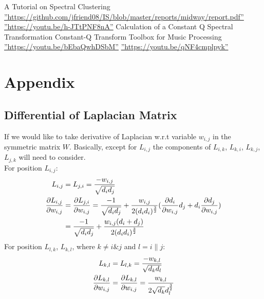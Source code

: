 \documentclass[final]{siamltexmm}
\begin{document}
\begin{thebibliography}{10}
 {\sc A Tutorial on Spectral Clustering}
 \hyperref[baseline]{''https://github.com/jfriend08/IS/blob/master/reports/midway/report.pdf''}
 \hyperref[baseline]{''https://youtu.be/h-JTtPNF8nA''}
 {\sc Calculation of a Constant Q Spectral Transformation}
 {\sc Constant-Q Transform Toolbox for Music Processing}
 \hyperref[baseline]{''https://youtu.be/bEbaQwhDSbM''}
 \hyperref[baseline]{''https://youtu.be/qNF4cmplpyk''}


\end{thebibliography}

\section{Appendix}
\subsection{Differential of Laplacian Matrix}
If we would like to take derivative of Laplacian w.r.t variable $w_{i,j}$ in the symmetric matrix $W$. Basically, except for $L_{i,j}$ the components of $L_{i,k}$, $L_{k,i}$, $L_{k,j}$, $L_{j,k}$ will need to consider.\\
For position $L_{i,j}$:
\begin{equation}
\begin{aligned}
L_{i,j} &= L_{j,i} =  {-w_{i,j} \over \sqrt{d_id_j}} \\
{\partial L_{i,j} \over \partial w_{i,j}} &= {\partial L_{j,i} \over \partial w_{i,j}} = {-1 \over \sqrt{d_id_j}} + {w_{i,j} \over 2(d_id_i)^{3\over 2}}({\partial d_i \over \partial w_{i,j}}d_j + d_i{\partial d_j \over \partial w_{i,j}}) \\
&= {-1 \over \sqrt{d_id_j}} + {w_{i,j}(d_i+d_j) \over 2(d_id_i)^{3\over 2}}
\end{aligned}
\end{equation}
For position $L_{l,k}$, $L_{k,l}$, where $k \neq i \& j$ and $l = i\|j$:
\begin{equation}
\begin{aligned}
L_{k,l} &= L_{l,k} =  {-w_{k,l} \over \sqrt{d_kd_l}} \\
{\partial L_{k,l} \over \partial w_{i,j}} &= {\partial L_{k,l} \over \partial w_{i,j}} = {w_{k,l} \over 2\sqrt{d_k}d_l^{3\over2}}
\end{aligned}
\end{equation}
\end{document}
